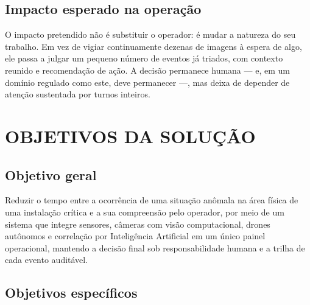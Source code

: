 \documentclass[12pt,a4paper,oneside]{article}
\begin{document}
\subsection{Impacto esperado na operação}

O impacto pretendido não é substituir o operador: é mudar a natureza do seu
trabalho. Em vez de vigiar continuamente dezenas de imagens à espera de algo,
ele passa a julgar um pequeno número de eventos já triados, com contexto
reunido e recomendação de ação. A decisão permanece humana — e, em um domínio
regulado como este, deve permanecer —, mas deixa de depender de atenção
sustentada por turnos inteiros.

\section{OBJETIVOS DA SOLUÇÃO}
\label{sec:objetivos}

\subsection{Objetivo geral}

Reduzir o tempo entre a ocorrência de uma situação anômala na área física de
uma instalação crítica e a sua compreensão pelo operador, por meio de um
sistema que integre sensores, câmeras com visão computacional, drones
autônomos e correlação por Inteligência Artificial em um único painel
operacional, mantendo a decisão final sob responsabilidade humana e a trilha
de cada evento auditável.

\subsection{Objetivos específicos}
\end{document}
